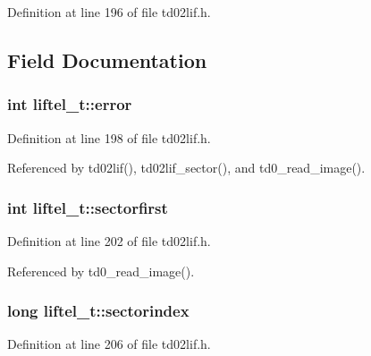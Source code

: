 Definition at line 196 of file td02lif.\+h.



\subsection{Field Documentation}
\subsubsection[{\texorpdfstring{error}{error}}]{\setlength{\rightskip}{0pt plus 5cm}int liftel\+\_\+t\+::error}\hypertarget{structliftel__t_abc69ee3835be72037c41a11b7457cecd}{}\label{structliftel__t_abc69ee3835be72037c41a11b7457cecd}


Definition at line 198 of file td02lif.\+h.



Referenced by td02lif(), td02lif\+\_\+sector(), and td0\+\_\+read\+\_\+image().

\subsubsection[{\texorpdfstring{sectorfirst}{sectorfirst}}]{\setlength{\rightskip}{0pt plus 5cm}int liftel\+\_\+t\+::sectorfirst}\hypertarget{structliftel__t_a28dddd09745822ae834b073ad3c3bd98}{}\label{structliftel__t_a28dddd09745822ae834b073ad3c3bd98}


Definition at line 202 of file td02lif.\+h.



Referenced by td0\+\_\+read\+\_\+image().

\subsubsection[{\texorpdfstring{sectorindex}{sectorindex}}]{\setlength{\rightskip}{0pt plus 5cm}long liftel\+\_\+t\+::sectorindex}\hypertarget{structliftel__t_a13e9f8b2e23d8f028f456d4465beb4d5}{}\label{structliftel__t_a13e9f8b2e23d8f028f456d4465beb4d5}


Definition at line 206 of file td02lif.\+h.



